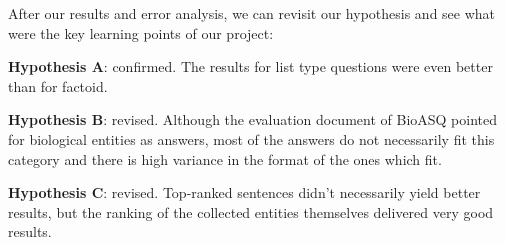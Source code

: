 After our results and error analysis, we can revisit our hypothesis and see what were the key learning points of our project:

\bigbreak 

\textbf{Hypothesis A}: confirmed. The results for list type questions were even better than for factoid. 

\bigbreak 

\textbf{Hypothesis B}: revised. Although the evaluation document of BioASQ pointed for biological entities as answers, most of the answers do not necessarily fit this category and there is high variance in the format of the ones which fit.

\bigbreak 

\textbf{Hypothesis C}: revised. Top-ranked sentences didn’t necessarily yield better results, but the ranking of the collected entities themselves delivered very good results.




